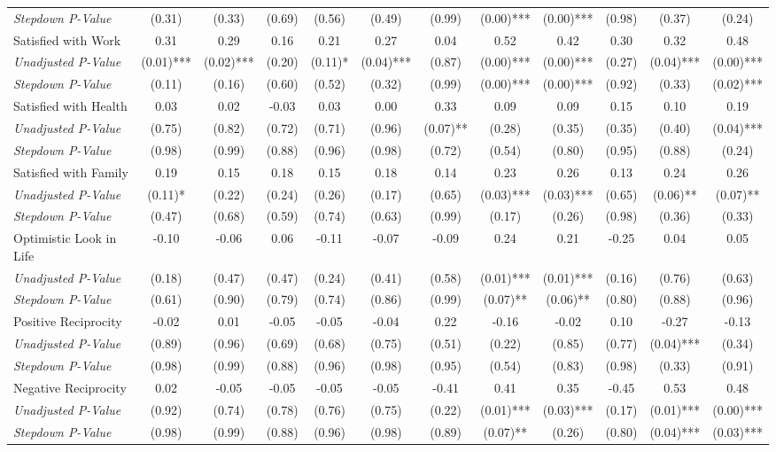 \begin{tabular}{l c c c c c c c c c c c}
\quad \textit{Stepdown P-Value} & (0.31) & (0.33) & (0.69) & (0.56) & (0.49) & (0.99) & (0.00)*** & (0.00)*** & (0.98) & (0.37) & (0.24) \\
Satisfied with Work & 0.31 & 0.29 & 0.16 & 0.21 & 0.27 & 0.04 & 0.52 & 0.42 & 0.30 & 0.32 & 0.48 \\
\quad \textit{Unadjusted P-Value} & (0.01)*** & (0.02)*** & (0.20) & (0.11)* & (0.04)*** & (0.87) & (0.00)*** & (0.00)*** & (0.27) & (0.04)*** & (0.00)*** \\
\quad \textit{Stepdown P-Value} & (0.11) & (0.16) & (0.60) & (0.52) & (0.32) & (0.99) & (0.00)*** & (0.00)*** & (0.92) & (0.33) & (0.02)*** \\
Satisfied with Health & 0.03 & 0.02 & -0.03 & 0.03 & 0.00 & 0.33 & 0.09 & 0.09 & 0.15 & 0.10 & 0.19 \\
\quad \textit{Unadjusted P-Value} & (0.75) & (0.82) & (0.72) & (0.71) & (0.96) & (0.07)** & (0.28) & (0.35) & (0.35) & (0.40) & (0.04)*** \\
\quad \textit{Stepdown P-Value} & (0.98) & (0.99) & (0.88) & (0.96) & (0.98) & (0.72) & (0.54) & (0.80) & (0.95) & (0.88) & (0.24) \\
Satisfied with Family & 0.19 & 0.15 & 0.18 & 0.15 & 0.18 & 0.14 & 0.23 & 0.26 & 0.13 & 0.24 & 0.26 \\
\quad \textit{Unadjusted P-Value} & (0.11)* & (0.22) & (0.24) & (0.26) & (0.17) & (0.65) & (0.03)*** & (0.03)*** & (0.65) & (0.06)** & (0.07)** \\
\quad \textit{Stepdown P-Value} & (0.47) & (0.68) & (0.59) & (0.74) & (0.63) & (0.99) & (0.17) & (0.26) & (0.98) & (0.36) & (0.33) \\
Optimistic Look in Life & -0.10 & -0.06 & 0.06 & -0.11 & -0.07 & -0.09 & 0.24 & 0.21 & -0.25 & 0.04 & 0.05 \\
\quad \textit{Unadjusted P-Value} & (0.18) & (0.47) & (0.47) & (0.24) & (0.41) & (0.58) & (0.01)*** & (0.01)*** & (0.16) & (0.76) & (0.63) \\
\quad \textit{Stepdown P-Value} & (0.61) & (0.90) & (0.79) & (0.74) & (0.86) & (0.99) & (0.07)** & (0.06)** & (0.80) & (0.88) & (0.96) \\
Positive Reciprocity & -0.02 & 0.01 & -0.05 & -0.05 & -0.04 & 0.22 & -0.16 & -0.02 & 0.10 & -0.27 & -0.13 \\
\quad \textit{Unadjusted P-Value} & (0.89) & (0.96) & (0.69) & (0.68) & (0.75) & (0.51) & (0.22) & (0.85) & (0.77) & (0.04)*** & (0.34) \\
\quad \textit{Stepdown P-Value} & (0.98) & (0.99) & (0.88) & (0.96) & (0.98) & (0.95) & (0.54) & (0.83) & (0.98) & (0.33) & (0.91) \\
Negative Reciprocity & 0.02 & -0.05 & -0.05 & -0.05 & -0.05 & -0.41 & 0.41 & 0.35 & -0.45 & 0.53 & 0.48 \\
\quad \textit{Unadjusted P-Value} & (0.92) & (0.74) & (0.78) & (0.76) & (0.75) & (0.22) & (0.01)*** & (0.03)*** & (0.17) & (0.01)*** & (0.00)*** \\
\quad \textit{Stepdown P-Value} & (0.98) & (0.99) & (0.88) & (0.96) & (0.98) & (0.89) & (0.07)** & (0.26) & (0.80) & (0.04)*** & (0.03)*** \\
\bottomrule
\end{tabular}
